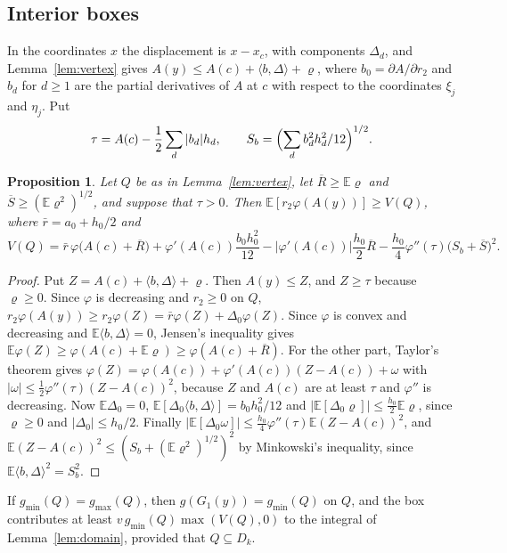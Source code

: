 \documentclass[11pt]{amsart}
\newtheorem{proposition}[theorem]{Proposition}
\theoremstyle{definition}
\theoremstyle{remark}
\numberwithin{equation}{section}
\newcommand{\E}{\mathbb{E}}
\newcommand{\gmin}{g_{\min}}
\newcommand{\gmax}{g_{\max}}
\begin{document}
\subsection{Interior boxes}
In the coordinates $x$ the displacement is $x-x_c$, with components $\Delta_d$, and Lemma~\ref{lem:vertex} gives $A(y)\le A(c)+\langle b,\Delta\rangle+\varrho$, where $b_0=\partial A/\partial r_2$ and $b_d$ for $d\ge1$ are the partial derivatives of $A$ at $c$ with respect to the coordinates $\xi_j$ and $\eta_j$. Put
\[
\tau=A(c)-\frac12\sum_d|b_d|h_d,\qquad S_b=\Bigl(\sum_db_d^2h_d^2/12\Bigr)^{1/2}.
\]

\begin{proposition}\label{prop:interior}
Let $Q$ be as in Lemma~\textup{\ref{lem:vertex}}, let $\overline R\ge\E\varrho$ and $\overline S\ge(\E\varrho^2)^{1/2}$, and suppose that $\tau>0$. Then $\E[r_2\varphi(A(y))]\ge V(Q)$, where $\bar r=a_0+h_0/2$ and
\[
V(Q)=\bar r\,\varphi\bigl(A(c)+\overline R\bigr)+\varphi'(A(c))\frac{b_0h_0^2}{12}-|\varphi'(A(c))|\frac{h_0}2\overline R-\frac{h_0}4\varphi''(\tau)\bigl(S_b+\overline S\bigr)^2.
\]
\end{proposition}

\begin{proof}
Put $Z=A(c)+\langle b,\Delta\rangle+\varrho$. Then $A(y)\le Z$, and $Z\ge\tau$ because $\varrho\ge0$. Since $\varphi$ is decreasing and $r_2\ge0$ on $Q$, $r_2\varphi(A(y))\ge r_2\varphi(Z)=\bar r\varphi(Z)+\Delta_0\varphi(Z)$. Since $\varphi$ is convex and decreasing and $\E\langle b,\Delta\rangle=0$, Jensen's inequality gives $\E\varphi(Z)\ge\varphi(A(c)+\E\varrho)\ge\varphi(A(c)+\overline R)$. For the other part, Taylor's theorem gives $\varphi(Z)=\varphi(A(c))+\varphi'(A(c))(Z-A(c))+\omega$ with $|\omega|\le\frac12\varphi''(\tau)(Z-A(c))^2$, because $Z$ and $A(c)$ are at least $\tau$ and $\varphi''$ is decreasing. Now $\E\Delta_0=0$, $\E[\Delta_0\langle b,\Delta\rangle]=b_0h_0^2/12$ and $|\E[\Delta_0\varrho]|\le\frac{h_0}2\E\varrho$, since $\varrho\ge0$ and $|\Delta_0|\le h_0/2$. Finally $|\E[\Delta_0\omega]|\le\frac{h_0}4\varphi''(\tau)\E(Z-A(c))^2$, and $\E(Z-A(c))^2\le(S_b+(\E\varrho^2)^{1/2})^2$ by Minkowski's inequality, since $\E\langle b,\Delta\rangle^2=S_b^2$.
\end{proof}

If $\gmin(Q)=\gmax(Q)$, then $g(G_1(y))=\gmin(Q)$ on $Q$, and the box contributes at least $v\,\gmin(Q)\max(V(Q),0)$ to the integral of Lemma~\ref{lem:domain}, provided that $Q\subseteq D_k$.
\end{document}
